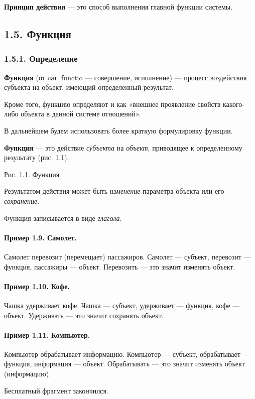 \documentclass[11pt,a4paper]{article}
\begin{document}
\textbf{Принцип действия} — это способ выполнения главной функции системы.

\subsection*{1.5. Функция}

\subsubsection*{1.5.1. Определение}

\textbf{Функция} (от лат. functio — совершение, исполнение) — процесс
воздействия субъекта на объект, имеющий определенный результат.

Кроме того, функцию определяют и как «внешнее проявление свойств какого-либо
объекта в данной системе отношений».

В дальнейшем будем использовать более краткую формулировку функции.

\textbf{Функция} — это действие \emph{субъекта} на \emph{объект}, приводящее к
определенному результату (рис. 1.1).
\begin{center}
  Рис. 1.1. Функция
\end{center}
Результатом действия может быть \emph{изменение} параметра объекта или его
\emph{сохранение}.

Функция записывается в виде \emph{глагола}.

\paragraph{Пример 1.9. Самолет.}
Самолет перевозит (перемещает) пассажиров. Самолет — субъект, перевозит —
функция, пассажиры — объект. Перевозить — это значит изменять объект.

\paragraph{Пример 1.10. Кофе.}
Чашка удерживает кофе. Чашка — субъект, удерживает — функция, кофе —
объект. Удерживать — это значит сохранять объект.

\paragraph{Пример 1.11. Компьютер.}
Компьютер обрабатывает информацию. Компьютер — субъект, обрабатывает —
функция, информация — объект. Обрабатывать — это значит изменять объект
(информацию).
\begin{center}
  Бесплатный фрагмент закончился.
\end{center}
\end{document}
